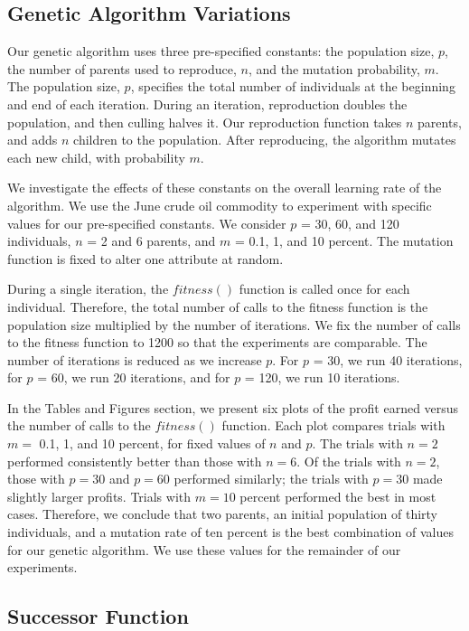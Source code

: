 \documentclass[12pt]{article}
\begin{document}
\subsection{Genetic Algorithm Variations}

Our genetic algorithm uses three pre-specified constants: the population size, $p$, the
number of parents used to reproduce, $n$, and the mutation probability, $m$. The
population size, $p$, specifies the total number of individuals at the beginning
and end of each iteration. During an iteration, reproduction doubles the
population, and then culling halves it. Our reproduction function takes $n$
parents, and adds $n$ children to the population. After reproducing, the
algorithm mutates each new child, with probability $m$.

We investigate the effects of these constants on the overall learning rate of
the algorithm. We use the June crude oil commodity to experiment with specific
values for our pre-specified constants. We consider $p$ = 30, 60, and 120
individuals, $n$ = 2 and 6 parents, and $m$ = 0.1, 1, and 10 percent.  The
mutation function is fixed to alter one attribute at random.

During a single iteration, the $fitness()$ function is called once for each
individual.  Therefore, the total number of calls to the fitness function is the
population size multiplied by the number of iterations.  We fix the number of
calls to the fitness function to 1200 so that the experiments are comparable.
The number of iterations is reduced as we increase $p$. For $p$ = 30, we run 40
iterations, for $p$ = 60, we run 20 iterations, and for $p$ = 120, we run 10
iterations.

In the Tables and Figures section, we present six plots of the profit earned
versus the number of calls to the $fitness()$ function.  Each plot compares
trials with $m = $ 0.1, 1, and 10 percent, for fixed values of $n$ and $p$.  The
trials with $n = 2$ performed consistently better than those with $n = 6$.  Of
the trials with $n = 2$, those with $p = 30$ and $p = 60$ performed similarly;
the trials with $p = 30$ made slightly larger profits.  Trials with $m = 10$
percent performed the best in most cases.  Therefore, we conclude that two
parents, an initial population of thirty individuals, and a mutation rate of ten
percent is the best combination of values for our genetic algorithm.  We use
these values for the remainder of our experiments.

\subsection{Successor Function}
\end{document}
